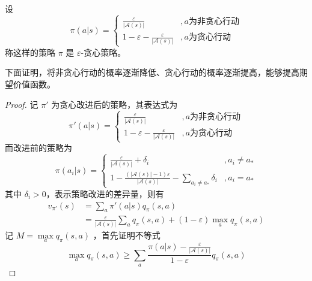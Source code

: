 \begin{Definition}
    设
    \begin{equation}
        \pi(a|s)=
        \begin{cases}
            \frac{\varepsilon}{|\mathcal A(s)|}&, a\text{为非贪心行动}\\
            1-\varepsilon-\frac{\varepsilon}{|\mathcal A(s)|}&, a\text{为贪心行动}
        \end{cases}
    \end{equation}
称这样的策略 $\pi$ 是 $\varepsilon$-贪心策略。
\end{Definition}

下面证明，将非贪心行动的概率逐渐降低、贪心行动的概率逐渐提高，能够提高期望价值函数。

\begin{proof}
    记 $\pi'$ 为贪心改进后的策略，其表达式为
    \begin{equation}
        \pi'(a|s)=
        \begin{cases}
            \frac{\varepsilon}{|\mathcal A(s)|}&, a\text{为非贪心行动}\\
            1-\varepsilon-\frac{\varepsilon}{|\mathcal A(s)|}&, a\text{为贪心行动}
        \end{cases}
    \end{equation}
    而改进前的策略为
    \begin{equation}
        \pi(a_i|s)=
\begin{cases}
\frac{\varepsilon}{|\mathcal A(s)|}+\delta_i&,a_i\neq a_*\\
1-\frac{(|\mathcal A(s)|-1)\varepsilon}{|\mathcal A(s)|}-\sum_{a_i\neq a_*}\delta_i&,a_i=a_*
\end{cases}
    \end{equation}
    其中 $\delta_i>0$，表示策略改进的差异量，则有
    \begin{equation}\label{eq:beforeineq}
        \begin{aligned}
            v_{\pi'}(s)&=\sum_a
            \pi'(a|s)q_\pi(s,a)\\
            &=\frac{\varepsilon}{|\mathcal A(s)|}\sum_aq_\pi(s,a)+(1-\varepsilon)\max\limits_aq_\pi(s,a)
            \end{aligned}
    \end{equation}
    记 $M=\max\limits_aq_\pi(s,a)$ ，首先证明不等式
    \begin{equation}\label{eq:ineq1}
        \displaystyle \max\limits_aq_\pi(s,a)\geq\sum_a\frac{\pi(a|s)-\frac{\varepsilon}{|\mathcal A(s)|}}{1-\varepsilon}q_\pi(s,a)

\end{equation}
\end{proof}
